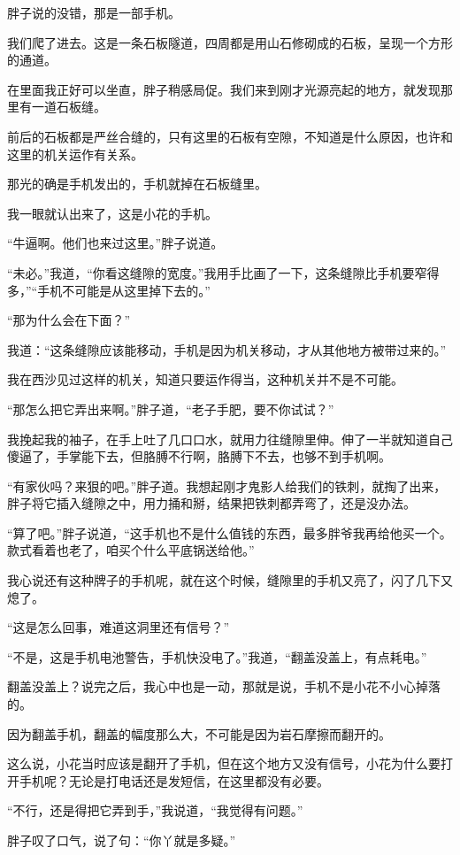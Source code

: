 胖子说的没错，那是一部手机。

我们爬了进去。这是一条石板隧道，四周都是用山石修砌成的石板，呈现一个方形的通道。

在里面我正好可以坐直，胖子稍感局促。我们来到刚才光源亮起的地方，就发现那里有一道石板缝。

前后的石板都是严丝合缝的，只有这里的石板有空隙，不知道是什么原因，也许和这里的机关运作有关系。

那光的确是手机发出的，手机就掉在石板缝里。

我一眼就认出来了，这是小花的手机。

“牛逼啊。他们也来过这里。”胖子说道。

“未必。”我道，“你看这缝隙的宽度。”我用手比画了一下，这条缝隙比手机要窄得多，”“手机不可能是从这里掉下去的。”

“那为什么会在下面？”

我道：“这条缝隙应该能移动，手机是因为机关移动，才从其他地方被带过来的。”

我在西沙见过这样的机关，知道只要运作得当，这种机关并不是不可能。

“那怎么把它弄出来啊。”胖子道，“老子手肥，要不你试试？”

我挽起我的袖子，在手上吐了几口口水，就用力往缝隙里伸。伸了一半就知道自己傻逼了，手掌能下去，但胳膊不行啊，胳膊下不去，也够不到手机啊。

“有家伙吗？来狠的吧。”胖子道。我想起刚才鬼影人给我们的铁刺，就掏了出来，胖子将它插入缝隙之中，用力捅和掰，结果把铁刺都弄弯了，还是没办法。

“算了吧。”胖子说道，“这手机也不是什么值钱的东西，最多胖爷我再给他买一个。款式看着也老了，咱买个什么平底锅送给他。”

我心说还有这种牌子的手机呢，就在这个时候，缝隙里的手机又亮了，闪了几下又熄了。

“这是怎么回事，难道这洞里还有信号？”

“不是，这是手机电池警告，手机快没电了。”我道，“翻盖没盖上，有点耗电。”

翻盖没盖上？说完之后，我心中也是一动，那就是说，手机不是小花不小心掉落的。

因为翻盖手机，翻盖的幅度那么大，不可能是因为岩石摩擦而翻开的。

这么说，小花当时应该是翻开了手机，但在这个地方又没有信号，小花为什么要打开手机呢？无论是打电话还是发短信，在这里都没有必要。

“不行，还是得把它弄到手，”我说道，“我觉得有问题。”

胖子叹了口气，说了句：“你丫就是多疑。”


